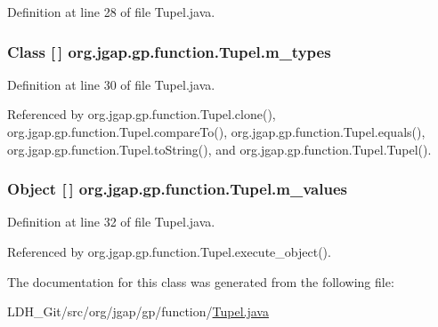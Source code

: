 Definition at line 28 of file Tupel.\-java.

\hypertarget{classorg_1_1jgap_1_1gp_1_1function_1_1_tupel_a59be45cfe4882514ab8a66041bbf08f8}{
\subsubsection[{m\-\_\-types}]{\setlength{\rightskip}{0pt plus 5cm}Class \mbox{[}$\,$\mbox{]} org.\-jgap.\-gp.\-function.\-Tupel.\-m\-\_\-types\hspace{0.3cm}{\ttfamily [private]}}}\label{classorg_1_1jgap_1_1gp_1_1function_1_1_tupel_a59be45cfe4882514ab8a66041bbf08f8}


Definition at line 30 of file Tupel.\-java.



Referenced by org.\-jgap.\-gp.\-function.\-Tupel.\-clone(), org.\-jgap.\-gp.\-function.\-Tupel.\-compare\-To(), org.\-jgap.\-gp.\-function.\-Tupel.\-equals(), org.\-jgap.\-gp.\-function.\-Tupel.\-to\-String(), and org.\-jgap.\-gp.\-function.\-Tupel.\-Tupel().

\hypertarget{classorg_1_1jgap_1_1gp_1_1function_1_1_tupel_a35cef8da31159b4f460ebe12c83d16e8}{
\subsubsection[{m\-\_\-values}]{\setlength{\rightskip}{0pt plus 5cm}Object \mbox{[}$\,$\mbox{]} org.\-jgap.\-gp.\-function.\-Tupel.\-m\-\_\-values\hspace{0.3cm}{\ttfamily [private]}}}\label{classorg_1_1jgap_1_1gp_1_1function_1_1_tupel_a35cef8da31159b4f460ebe12c83d16e8}


Definition at line 32 of file Tupel.\-java.



Referenced by org.\-jgap.\-gp.\-function.\-Tupel.\-execute\-\_\-object().



The documentation for this class was generated from the following file\-:\begin{DoxyCompactItemize}
\item 
L\-D\-H\-\_\-\-Git/src/org/jgap/gp/function/\hyperlink{_tupel_8java}{Tupel.\-java}\end{DoxyCompactItemize}
